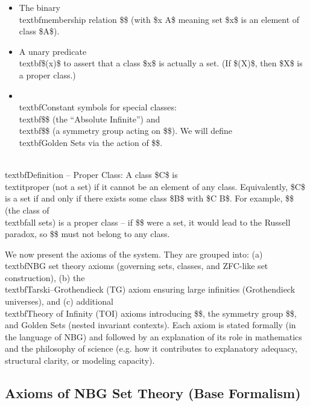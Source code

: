 \documentclass[11pt]{article}
\begin{document}
\begin{itemize}
  \item The binary \\textbf{membership} relation \$\in\$ (with \$x \in A\$ meaning set \$x\$ is an element of class \$A\$).
  \item A unary predicate \\textbf{\$(x)\$} to assert that a class \$x\$ is actually a set. (If \$\neg{}(X)\$, then \$X\$ is a proper class.)
  \item \\textbf{Constant symbols} for special classes: \\textbf{\$\infty\$} (the “Absolute Infinite”) and \\textbf{\$\Sym\$} (a symmetry group acting on \$\infty\$). We will define \\textbf{Golden Sets} via the action of \$\Sym\$.

\end{itemize}
\\textbf{Definition – Proper Class}: A class \$C\$ is \\textit{proper} (not a set) if it cannot be an element of any class. Equivalently, \$C\$ is a set if and only if there exists some class \$B\$ with \$C \in B\$. For example, \$\infty\$ (the class of \\textbf{all} sets) is a proper class – if \$\infty\$ were a set, it would lead to the Russell paradox, so \$\infty\$ must not belong to any class.

We now present the axioms of the system. They are grouped into: (a) \\textbf{NBG set theory axioms} (governing sets, classes, and ZFC-like set construction), (b) the \\textbf{Tarski–Grothendieck (TG) axiom} ensuring large infinities (Grothendieck universes), and (c) additional \\textbf{Theory of Infinity (TOI) axioms} introducing \$\infty\$, the symmetry group \$\Sym\$, and Golden Sets (nested invariant contexts). Each axiom is stated formally (in the language of NBG) and followed by an explanation of its role in mathematics and the philosophy of science (e.g. how it contributes to explanatory adequacy, structural clarity, or modeling capacity).

\subsection*{Axioms of NBG Set Theory (Base Formalism)}
\end{document}
